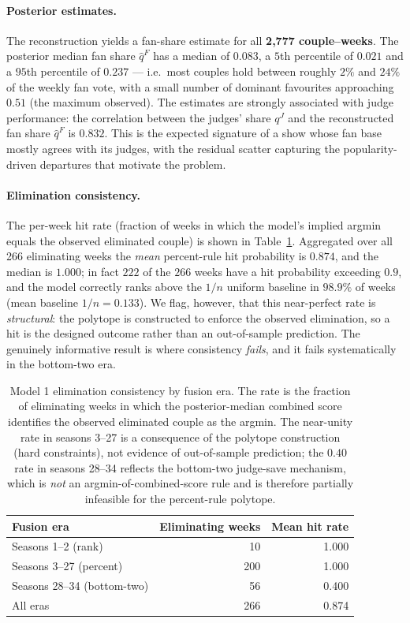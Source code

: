 \documentclass{article}
\begin{document}
\paragraph{Posterior estimates.} The reconstruction yields a fan-share estimate for all
\textbf{2{,}777 couple--weeks}. The posterior median fan share $\hat q^F$ has a median of
$0.083$, a $5$th percentile of $0.021$ and a $95$th percentile of $0.237$ --- i.e.\ most
couples hold between roughly $2\%$ and $24\%$ of the weekly fan vote, with a small number
of dominant favourites approaching $0.51$ (the maximum observed). The estimates are
strongly associated with judge performance: the correlation between the judges' share
$q^{J}$ and the reconstructed fan share $\hat q^{F}$ is $\mathbf{0.832}$. This is the
expected signature of a show whose fan base mostly agrees with its judges, with the
residual scatter capturing the popularity-driven departures that motivate the problem.

\paragraph{Elimination consistency.} The per-week hit rate (fraction of weeks in which the
model's implied argmin equals the observed eliminated couple) is shown in
Table~\ref{tab:m1consist}. Aggregated over all 266 eliminating weeks the \emph{mean}
percent-rule hit probability is $0.874$, and the median is $1.000$; in fact $222$ of the
$266$ weeks have a hit probability exceeding $0.9$, and the model correctly ranks above
the $1/n$ uniform baseline in $98.9\%$ of weeks (mean baseline $1/n=0.133$). We flag,
however, that this near-perfect rate is \emph{structural}: the polytope is constructed to
enforce the observed elimination, so a hit is the designed outcome rather than an
out-of-sample prediction. The genuinely informative result is where consistency
\emph{fails}, and it fails systematically in the bottom-two era.

\begin{table}[H]
\centering
\caption{Model 1 elimination consistency by fusion era. The rate is the fraction of
eliminating weeks in which the posterior-median combined score identifies the observed
eliminated couple as the argmin. The near-unity rate in seasons 3--27 is a consequence of
the polytope construction (hard constraints), not evidence of out-of-sample prediction;
the $0.40$ rate in seasons 28--34 reflects the bottom-two judge-save mechanism, which is
\emph{not} an argmin-of-combined-score rule and is therefore partially infeasible for the
percent-rule polytope.}
\label{tab:m1consist}
\begin{tabular}{lrr}
\toprule
Fusion era & Eliminating weeks & Mean hit rate \\
\midrule
Seasons 1--2 (rank)            & 10  & 1.000 \\
Seasons 3--27 (percent)        & 200 & 1.000 \\
Seasons 28--34 (bottom-two)    & 56  & 0.400 \\
\midrule
All eras                       & 266 & 0.874 \\
\bottomrule
\end{tabular}
\end{table}
\end{document}

